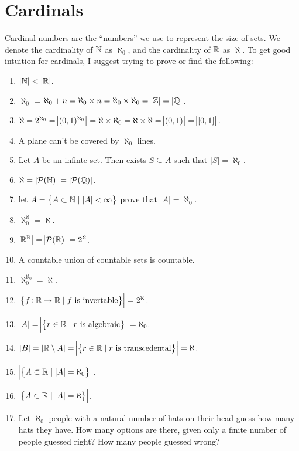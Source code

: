 \documentclass[11pt,a4paper]{article}
\begin{document}
\newpage
\section{Cardinals}
Cardinal numbers are the ``numbers'' we use to represent the size of 
sets. We denote the cardinality of $\mathbb{N}$ as $\aleph_0$, and the cardinality
of $\mathbb{R}$ as $\aleph$. To get good intuition for cardinals, I suggest trying 
to prove or find the following:
\begin{enumerate}
    \item $|\mathbb{N}| < |\mathbb{R}|$.
    \item $\aleph_{0}$ = 
    $\aleph_{0} + n = \aleph_0 \times n=\aleph_0\times\aleph_0=|\mathbb{Z}|=|\mathbb{Q}|$.
  \item $\aleph = 2^{\aleph_0} = \abs{(0,1)^{\aleph_0}} = \aleph\times\aleph_0 
    = \aleph\times\aleph = \abs{(0,1)} = \abs{[0,1]}$.
    \item A plane can't be covered by $\aleph_0$ lines.
    \item Let $A$ be an infinte set. Then exists $S \subseteq A$ such
      that $|S| = \aleph_0$.
    \item $\aleph = |\mathcal{P}(\mathbb{N})|= |\mathcal{P}(\mathbb{Q})|$.
    \item let $A = \set{A \subset \mathbb{N}\mid |A| < \infty}$ prove that
      $|A| = \aleph_0$.
    \item $\aleph^\aleph_0=\aleph$.
    \item $\abs{\mathbb{R}^{\mathbb{R}}} = \abs{\mathcal{P}(\mathbb{R})} = 2^\aleph$.
    \item A countable union of countable sets is countable.
    \item $\aleph_0^{\aleph_0} =\aleph$.
    \item $\abs{\set{f \colon \mathbb{R}\to \mathbb{R}\mid f \text{ is invertable}}} = 
      2^\aleph$.
    \item $|A| =
      \abs{\set{r \in \mathbb{R}\mid r \text{ is algebraic}}} = \aleph_0$.
    \item $|B| = |\mathbb{R} \setminus A| =
      \abs{\set{r \in \mathbb{R}\mid r \text{ is transcedental}}} = \aleph$.
    \item $\abs{\set{A \subset \mathbb{R}\mid |A| = \aleph_0}}$.
    \item $\abs{\set{A \subset \mathbb{R}\mid |A| = \aleph}}$.
    \item Let $\aleph_0$ people with a natural number of hats on their head 
    guess how many hats they have. How many options are there, given only 
    a finite number of people guessed right? How many people guessed wrong?
    
\end{enumerate}
\end{document}
